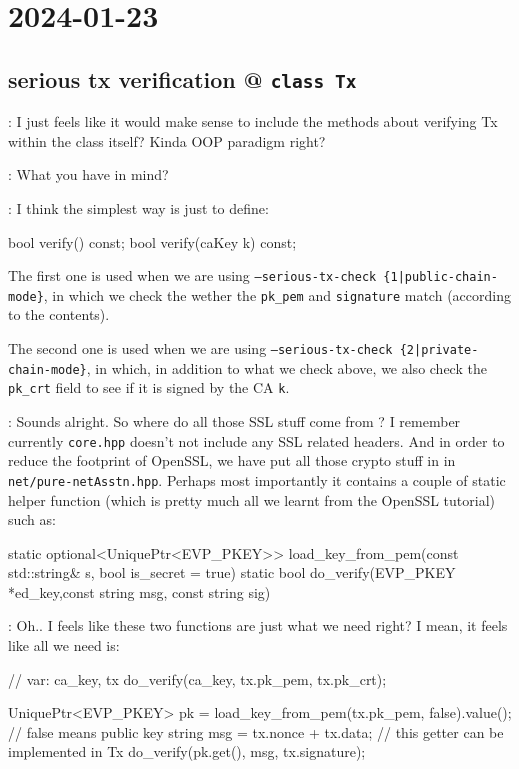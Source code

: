
\section*{2024-01-23}

\subsection*{serious tx verification @ \texttt{class Tx} }
 : I just feels like it would make sense to include the methods
about verifying Tx within the class  itself? Kinda OOP paradigm right?

 : What you have in mind?

 : I think the simplest way is just to define:

\begin{simplec}
bool verify() const;
bool verify(caKey k) const;
\end{simplec}

The first one is used when we are using \texttt{--serious-tx-check
  \{1|public-chain-mode\}}, in which we check the wether the \texttt{pk\_pem}
and \texttt{signature} match (according to the contents).

The second one is used when we are using \texttt{--serious-tx-check
  \{2|private-chain-mode\}}, in which, in addition to what we check above, we
also check the \texttt{pk\_crt} field to see if it is signed by the CA \texttt{k}.

 : Sounds alright. So where do all those SSL stuff come from ? I
remember currently \texttt{core.hpp} doesn't not include any SSL related headers.
And in order to reduce the footprint of OpenSSL, we have put all those crypto
stuff in  in \texttt{net/pure-netAsstn.hpp}. Perhaps most
importantly it contains a couple of static helper function (which is pretty much
all we learnt from the OpenSSL tutorial) such as:
\begin{simplec}
static optional<UniquePtr<EVP_PKEY>> load_key_from_pem(const std::string& s, bool is_secret = true)
static bool do_verify(EVP_PKEY *ed_key,const string msg, const string sig)
\end{simplec}

 : Oh.. I feels like these two functions are just what we need
right? I mean, it feels like all we need is:

\begin{simplec}
// var: ca_key, tx
do_verify(ca_key, tx.pk_pem, tx.pk_crt);

UniquePtr<EVP_PKEY> pk = load_key_from_pem(tx.pk_pem, false).value(); // false means public key
string msg = tx.nonce + tx.data; // this getter can be implemented in Tx
do_verify(pk.get(), msg, tx.signature);
\end{simplec}

